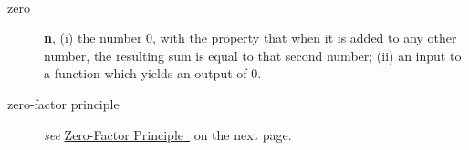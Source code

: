 \documentclass[10pt,]{book}
\newcommand{\terminology}[1]{\textbf{#1}}
\theoremstyle{plain}
\theoremstyle{definition}
\theoremstyle{definition}
\theoremstyle{definition}
\numberwithin{equation}{part}
\begin{document}
\paragraph[{}]{}\hypertarget{paragraphs-29}{}
\leavevmode%
\begin{description}
\item[{zero}]\hypertarget{li-859}{}\terminology{n}, (i) the number \(0\), with the property that when it is added to any other number, the resulting sum is equal to that second number; (ii) an input to a function which yields an output of \(0\).%
\item[{zero-factor principle}]\hypertarget{li-860}{}\emph{see} \hyperref[assemblage-zero-factor-principle]{Zero-Factor Principle~} on the next page.%
\end{description}
%
\typeout{************************************************}
\typeout{************************************************}
\end{document}
